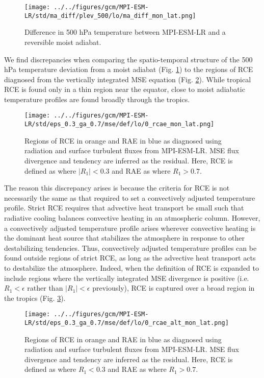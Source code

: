 \documentclass[11pt]{article}
\begin{document}
\begin{figure}[htbp]
\centering
\texttt{[image: ../../figures/gcm/MPI-ESM-LR/std/ma\_diff/plev\_500/lo/ma\_diff\_mon\_lat.png]}
\caption{\label{fig:orgd386116}Difference in 500 hPa temperature between MPI-ESM-LR and a reversible moist adiabat.}
\end{figure}

We find discrepancies when comparing the spatio-temporal structure of the 500 hPa temperature deviation from a moist adiabat (Fig. \ref{fig:orgd386116}) to the regions of RCE diagnosed from the vertically integrated MSE equation (Fig. \ref{fig:org196191e}). While tropical RCE is found only in a thin region near the equator, close to moist adiabatic temperature profiles are found broadly through the tropics.

\begin{figure}[htbp]
\centering
\texttt{[image: ../../figures/gcm/MPI-ESM-LR/std/eps\_0.3\_ga\_0.7/mse/def/lo/0\_rcae\_mon\_lat.png]}
\caption{\label{fig:org196191e}Regions of RCE in orange and RAE in blue as diagnosed using radiation and surface turbulent fluxes from MPI-ESM-LR. MSE flux divergence and tendency are inferred as the residual. Here, RCE is defined as where \(|R_1| < 0.3\) and RAE as where \(R_1 > 0.7\).}
\end{figure}

The reason this discrepancy arises is because the criteria for RCE is not necessarily the same as that required to set a convectively adjusted temperature profile. Strict RCE requires that advective heat transport be small such that radiative cooling balances convective heating in an atmospheric column. However, a convectively adjusted temperature profile arises wherever convective heating is the dominant heat source that stabilizes the atmosphere in response to other destabilizing tendencies. Thus, convectively adjusted temperature profiles can be found outside regions of strict RCE, as long as the advective heat transport acts to destabilize the atmosphere. Indeed, when the definition of RCE is expanded to include regions where the vertically integrated MSE divergence is positive (i.e. \(R_1<\epsilon\) rather than \(|R_1|<\epsilon\) previously), RCE is captured over a broad region in the tropics (Fig. \ref{fig:org1360b06}).

\begin{figure}[htbp]
\centering
\texttt{[image: ../../figures/gcm/MPI-ESM-LR/std/eps\_0.3\_ga\_0.7/mse/def/lo/0\_rcae\_alt\_mon\_lat.png]}
\caption{\label{fig:org1360b06}Regions of RCE in orange and RAE in blue as diagnosed using radiation and surface turbulent fluxes from MPI-ESM-LR. MSE flux divergence and tendency are inferred as the residual. Here, RCE is defined as where \(R_1 < 0.3\) and RAE as where \(R_1 > 0.7\).}
\end{figure}
\end{document}
